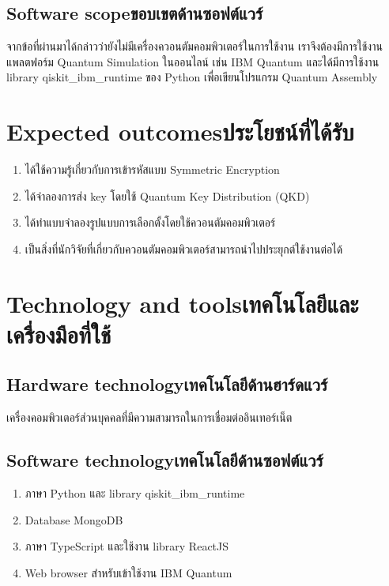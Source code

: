 \subsection{\ifenglish Software scope\else ขอบเขตด้านซอฟต์แวร์\fi}
จากข้อที่ผ่านมาได้กล่าวว่ายังไม่มีเครื่องควอนตัมคอมพิวเตอร์ในการใช้งาน เราจึงต้องมีการใช้งานแพลตฟอร์ม Quantum Simulation ในออนไลน์ เช่น IBM Quantum และได้มีการใช้งาน library qiskit\_ibm\_runtime ของ Python เพื่อเขียนโปรแกรม Quantum Assembly 

\section{\ifenglish Expected outcomes\else ประโยชน์ที่ได้รับ\fi}
\begin{enumerate}
    \item ได้ใช้ความรู้เกี่ยวกับการเข้ารหัสแบบ Symmetric Encryption 
    \item ได้จำลองการส่ง key โดยใช้ Quantum Key Distribution (QKD)
    \item ได้ทำแบบจำลองรูปแบบการเลือกตั้งโดยใช้ควอนตัมคอมพิวเตอร์
    \item เป็นสิ่งที่นักวิจัยที่เกี่ยวกับควอนตัมคอมพิวเตอร์สามารถนำไปประยุกต์ใช้งานต่อได้
\end{enumerate}

\section{\ifenglish Technology and tools\else เทคโนโลยีและเครื่องมือที่ใช้\fi}

\subsection{\ifenglish Hardware technology\else เทคโนโลยีด้านฮาร์ดแวร์\fi}
เครื่องคอมพิวเตอร์ส่วนบุคคลที่มีความสามารถในการเชื่อมต่ออินเทอร์เน็ต

\subsection{\ifenglish Software technology\else เทคโนโลยีด้านซอฟต์แวร์\fi}
\begin{enumerate}
    \item ภาษา Python และ library qiskit\_ibm\_runtime
    \item Database MongoDB
    \item ภาษา TypeScript และใช้งาน library ReactJS
    \item Web browser สำหรับเข้าใช้งาน IBM Quantum
\end{enumerate}

